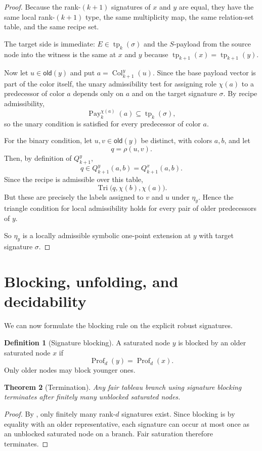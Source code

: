 \documentclass[11pt]{article}
\newtheorem{theorem}{Theorem}[section]
\theoremstyle{definition}
\newtheorem{definition}[theorem]{Definition}
\newcommand{\tp}{\operatorname{tp}}
\newcommand{\Prof}{\operatorname{Prof}}
\newcommand{\Tri}{\operatorname{Tri}}
\newcommand{\older}{\mathsf{old}}
\newcommand{\Col}{\operatorname{Col}}
\newcommand{\Pay}{\operatorname{Pay}}
\begin{document}
\begin{proof}
Because the rank-$(k+1)$ signatures of $x$ and $y$ are equal, they have the same local rank-$(k+1)$ type, the same multiplicity map, the same relation-set table, and the same recipe set.

The target side is immediate: $E\in\tp_k(\sigma)$ and the $S$-payload from the source node into the witness is the same at $x$ and $y$ because $\tp_{k+1}(x)=\tp_{k+1}(y)$.

Now let $u\in\older(y)$ and put $a=\Col^y_{k+1}(u)$. Since the base payload vector is part of the color itself, the unary admissibility test for assigning role $\chi(a)$ to a predecessor of color $a$ depends only on $a$ and on the target signature $\sigma$. By recipe admissibility,
\[
\Pay_k^{\chi(a)}(a)\subseteq \tp_k(\sigma),
\]
so the unary condition is satisfied for every predecessor of color $a$.

For the binary condition, let $u,v\in\older(y)$ be distinct, with colors $a,b$, and let
\[
q=\rho(u,v).
\]
Then, by definition of $Q^y_{k+1}$,
\[
q\in Q^y_{k+1}(a,b)=Q^x_{k+1}(a,b).
\]
Since the recipe is admissible over this table,
\[
\Tri\bigl(q,\chi(b),\chi(a)\bigr).
\]
But these are precisely the labels assigned to $v$ and $u$ under $\eta_y$. Hence the triangle condition for local admissibility holds for every pair of older predecessors of $y$.

So $\eta_y$ is a locally admissible symbolic one-point extension at $y$ with target signature $\sigma$.
\end{proof}

\section{Blocking, unfolding, and decidability}

We can now formulate the blocking rule on the explicit robust signatures.

\begin{definition}[Signature blocking]
A saturated node $y$ is blocked by an older saturated node $x$ if
\[
\Prof_d(y)=\Prof_d(x).
\]
Only older nodes may block younger ones.
\end{definition}

\begin{theorem}[Termination]
Any fair tableau branch using signature blocking terminates after finitely many unblocked saturated nodes.
\end{theorem}

\begin{proof}
By , only finitely many rank-$d$ signatures exist. Since blocking is by equality with an older representative, each signature can occur at most once as an unblocked saturated node on a branch. Fair saturation therefore terminates.
\end{proof}
\end{document}
